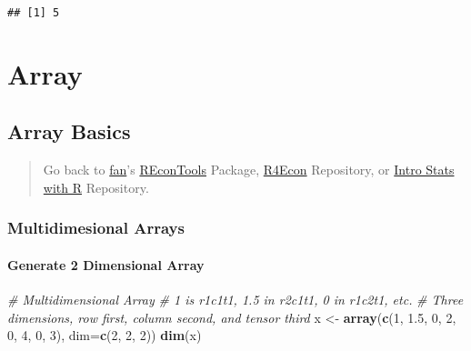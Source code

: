 \documentclass[
]{book}
\newenvironment{Shaded}{\begin{snugshade}}{\end{snugshade}}
\newcommand{\CommentTok}[1]{\textcolor[rgb]{0.56,0.35,0.01}{\textit{#1}}}
\newcommand{\DataTypeTok}[1]{\textcolor[rgb]{0.13,0.29,0.53}{#1}}
\newcommand{\DecValTok}[1]{\textcolor[rgb]{0.00,0.00,0.81}{#1}}
\newcommand{\FloatTok}[1]{\textcolor[rgb]{0.00,0.00,0.81}{#1}}
\newcommand{\KeywordTok}[1]{\textcolor[rgb]{0.13,0.29,0.53}{\textbf{#1}}}
\newcommand{\NormalTok}[1]{#1}
\newcommand{\StringTok}[1]{\textcolor[rgb]{0.31,0.60,0.02}{#1}}
\begin{document}
\begin{verbatim}
## [1] 5
\end{verbatim}

\hypertarget{array}{%
\section{Array}\label{array}}

\hypertarget{array-basics}{%
\subsection{Array Basics}\label{array-basics}}

\begin{quote}
Go back to \href{http://fanwangecon.github.io/CodeDynaAsset/}{fan}'s \href{https://fanwangecon.github.io/REconTools/}{REconTools} Package, \href{https://fanwangecon.github.io/R4Econ/}{R4Econ} Repository, or \href{https://fanwangecon.github.io/Stat4Econ/}{Intro Stats with R} Repository.
\end{quote}

\hypertarget{multidimesional-arrays}{%
\subsubsection{Multidimesional Arrays}\label{multidimesional-arrays}}

\hypertarget{generate-2-dimensional-array}{%
\paragraph{Generate 2 Dimensional Array}\label{generate-2-dimensional-array}}

\begin{Shaded}
\begin{Highlighting}[]
\CommentTok{# Multidimensional Array}
\CommentTok{# 1 is r1c1t1, 1.5 in r2c1t1, 0 in r1c2t1, etc.}
\CommentTok{# Three dimensions, row first, column second, and tensor third}
\NormalTok{x <-}\StringTok{ }\KeywordTok{array}\NormalTok{(}\KeywordTok{c}\NormalTok{(}\DecValTok{1}\NormalTok{, }\FloatTok{1.5}\NormalTok{, }\DecValTok{0}\NormalTok{, }\DecValTok{2}\NormalTok{, }\DecValTok{0}\NormalTok{, }\DecValTok{4}\NormalTok{, }\DecValTok{0}\NormalTok{, }\DecValTok{3}\NormalTok{), }\DataTypeTok{dim=}\KeywordTok{c}\NormalTok{(}\DecValTok{2}\NormalTok{, }\DecValTok{2}\NormalTok{, }\DecValTok{2}\NormalTok{))}
\KeywordTok{dim}\NormalTok{(x)}
\end{Highlighting}
\end{Shaded}
\end{document}
